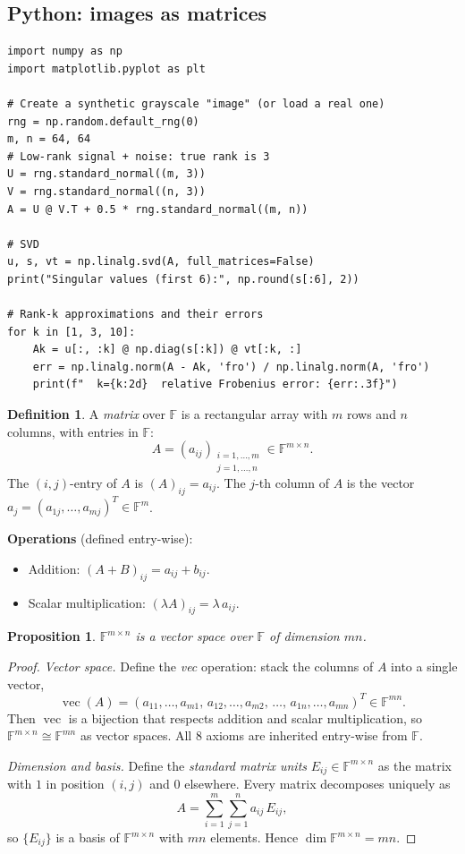 \documentclass[11pt]{article}
\theoremstyle{definition}
\newtheorem{definition}{Definition}[section]
\theoremstyle{plain}
\newtheorem{proposition}{Proposition}[section]
\begin{document}
\subsection{Python: images as matrices}
\begin{lstlisting}
import numpy as np
import matplotlib.pyplot as plt

# Create a synthetic grayscale "image" (or load a real one)
rng = np.random.default_rng(0)
m, n = 64, 64
# Low-rank signal + noise: true rank is 3
U = rng.standard_normal((m, 3))
V = rng.standard_normal((n, 3))
A = U @ V.T + 0.5 * rng.standard_normal((m, n))

# SVD
u, s, vt = np.linalg.svd(A, full_matrices=False)
print("Singular values (first 6):", np.round(s[:6], 2))

# Rank-k approximations and their errors
for k in [1, 3, 10]:
    Ak = u[:, :k] @ np.diag(s[:k]) @ vt[:k, :]
    err = np.linalg.norm(A - Ak, 'fro') / np.linalg.norm(A, 'fro')
    print(f"  k={k:2d}  relative Frobenius error: {err:.3f}")
\end{lstlisting}

\begin{definition}
  A \emph{matrix} over $\mathbb{F}$ is a rectangular array with $m$ rows and
  $n$ columns, with entries in $\mathbb{F}$:
  \[
    A = (a_{ij})_{\substack{i=1,\ldots,m\\j=1,\ldots,n}} \in \mathbb{F}^{m\times n}.
  \]
  The $(i,j)$-entry of $A$ is $(A)_{ij} = a_{ij}$.  The $j$-th column of
  $A$ is the vector $a_j = (a_{1j},\ldots,a_{mj})^T\in\mathbb{F}^m$.

  \textbf{Operations} (defined entry-wise):
  \begin{itemize}
    \item Addition: $(A+B)_{ij} = a_{ij} + b_{ij}$.
    \item Scalar multiplication: $(\lambda A)_{ij} = \lambda\, a_{ij}$.
  \end{itemize}
\end{definition}

\begin{proposition}
  $\mathbb{F}^{m\times n}$ is a vector space over $\mathbb{F}$ of dimension $mn$.
\end{proposition}
\begin{proof}
  \textit{Vector space.}  Define the \emph{vec} operation: stack the columns
  of $A$ into a single vector,
  \[
    \operatorname{vec}(A) = (a_{11},\ldots,a_{m1},\, a_{12},\ldots,a_{m2},\,
    \ldots,\, a_{1n},\ldots,a_{mn})^T \in \mathbb{F}^{mn}.
  \]
  Then $\operatorname{vec}$ is a bijection that respects addition and scalar
  multiplication, so $\mathbb{F}^{m\times n}\cong\mathbb{F}^{mn}$ as vector
  spaces.  All 8 axioms are inherited entry-wise from $\mathbb{F}$.

  \textit{Dimension and basis.}  Define the \emph{standard matrix units}
  $E_{ij}\in\mathbb{F}^{m\times n}$ as the matrix with $1$ in position
  $(i,j)$ and $0$ elsewhere.  Every matrix decomposes uniquely as
  \[
    A = \sum_{i=1}^m \sum_{j=1}^n a_{ij}\, E_{ij},
  \]
  so $\{E_{ij}\}$ is a basis of $\mathbb{F}^{m\times n}$ with $mn$ elements.
  Hence $\dim\mathbb{F}^{m\times n} = mn$.
\end{proof}
\end{document}
